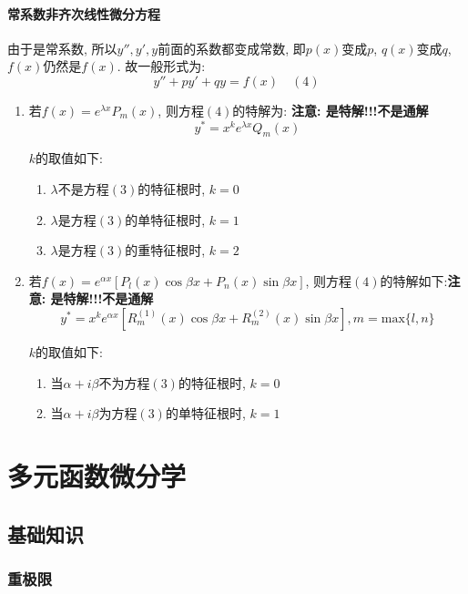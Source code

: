 \subsubsection{常系数非齐次线性微分方程}
由于是常系数, 所以$ y'',y',y $前面的系数都变成常数, 即$ p(x) $变成$ p $, $ q(x) $变成$ q $, $ f(x) $仍然是$ f(x) $. 故一般形式为:
\begin{equation*}
y''+py'+qy=f(x) \quad (4)
\end{equation*}
\begin{enumerate}
\item 若$ f(x)=e^{\lambda x}P_{m}(x) $, 则方程$ (4) $的特解为: \textbf{注意: 是特解!!!不是通解}
\begin{equation*}
y^{*}=x^{k}e^{\lambda x}Q_{m}(x)
\end{equation*}\par $ k $的取值如下:
\begin{enumerate}
\item $ \lambda $不是方程$ (3) $的特征根时, $ k=0 $
\item $ \lambda $是方程$ (3) $的单特征根时, $ k=1 $
\item $ \lambda $是方程$ (3) $的重特征根时, $ k=2 $
\end{enumerate}
\item 若$ f(x)=e^{\alpha x}[P_{l}(x)\cos \beta x+P_{n}(x)\sin \beta x] $, 则方程$ (4) $的特解如下:\textbf{注意: 是特解!!!不是通解}
\begin{equation*}
y^{*}=x^{k}e^{\alpha x}[R_{m}^{(1)}(x)\cos \beta x+R_{m}^{(2)}(x)\sin \beta x], m=\mathrm{max}\{l,n\}
\end{equation*}\par $ k $的取值如下:
\begin{enumerate}
\item 当$ \alpha+i\beta $不为方程$ (3) $的特征根时, $ k=0 $
\item 当$ \alpha+i\beta $为方程$ (3) $的单特征根时, $ k=1 $
\end{enumerate}
\end{enumerate}
\chapter{多元函数微分学}
\section{基础知识}
\subsection{重极限}
